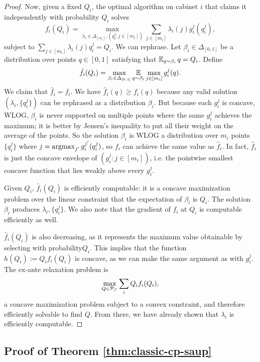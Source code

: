 \begin{proof}
  Now, given a fixed $Q_i$, the optimal algorithm on cabinet $i$ that claims it independently with probability $Q_i$ solves
    \[ f_i(Q_i) = \max_{\lambda_i \in \Delta_{[m_i]}, (q_i^j : j \in [m_i])} \sum_{j \in [m_i]} \lambda_i(j) g_i^j(q_i^j) , \]
  subject to $\sum_{j \in [m_i]} \lambda_i(j) q_i^j = Q_i$.
  We can rephrase.
  Let $\beta_i \in \Delta_{[0,1]}$ be a distribution over points $q \in [0,1]$ satisfying that $\operatorname*{\mathbb{E}}_{q \sim \beta_i} q = Q_i$.
  Define
    \[ \hat{f}_i(Q_i) = \max_{\beta_i \in \Delta_{[0,1]}} \operatorname*{\mathbb{E}}_{q \sim \beta_i} \max_{j \in [m_i]} g_i^j(q) . \]
  We claim that $\hat{f}_i = f_i$.
  We have $\hat{f}_i(q) \geq f_i(q)$ because any valid solution $(\lambda_i, \{q_i^j\})$ can be rephrased as a distribution $\beta_i$.
  But because each $g_i^j$ is concave, WLOG, $\beta_i$ is never supported on multiple points where the same $g_i^j$ achieves the maximum; it is better by Jensen's inequality to put all their weight on the average of the points.
  So the solution $\beta_i$ is WLOG a distribution over $m_i$ points $\{q_i^j\}$ where $j = \operatorname*{argmax}_{j'} g_i^{j'}(q_i^j)$, so $f_i$ can achieve the same value as $\hat{f}_i$.
  In fact, $\hat{f}_i$ is just the concave envelope of $(g_i^j : j \in [m_i])$, i.e. the pointwise smallest concave function that lies weakly above every $g_i^j$.

  Given $Q_i$, $\hat{f}_i(Q_i)$ is efficiently computable: it is a concave maximization problem over the linear constraint that the expectation of $\beta_i$ is $Q_i$.
  The solution $\beta_i$ produces $\lambda_i, \{q_i^j\}$.
  We also note that the gradient of $f_i$ at $Q_i$ is computable efficiently as well.

  $\hat{f}_i(Q_i)$ is also decreasing, as it represents the maximum value obtainable by selecting with probability$Q_i$.
  This implies that the function $h(Q_i) := Q_i f_i(Q_i)$ is concave, as we can make the same argument as with $g_i^j$. 
  The ex-ante relaxation  problem is
    \[ \max_{Q \in \mathcal{P}_{\mathcal{F}}} \sum_i Q_i f_i(Q_i) , \]
  a concave maximization problem subject to a convex constraint, and therefore efficiently solvable to find $Q$.
  From there, we have already shown that $\lambda_i$ is efficiently computable.
\end{proof}


\subsection{Proof of Theorem \ref{thm:classic-cp-saup}} \label{subsec:proof-cabinet-matroid}

